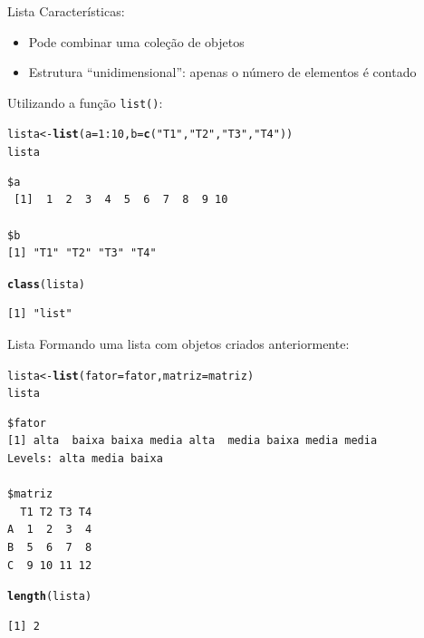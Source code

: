 \documentclass[10pt,handout]{beamer}\usepackage[]{graphicx}\usepackage[]{color}
\makeatletter
\newcommand{\hlnum}[1]{\textcolor[rgb]{0.686,0.059,0.569}{#1}}%
\newcommand{\hlstr}[1]{\textcolor[rgb]{0.192,0.494,0.8}{#1}}%
\newcommand{\hlopt}[1]{\textcolor[rgb]{0,0,0}{#1}}%
\newcommand{\hlstd}[1]{\textcolor[rgb]{0.345,0.345,0.345}{#1}}%
\newcommand{\hlkwb}[1]{\textcolor[rgb]{0.69,0.353,0.396}{#1}}%
\newcommand{\hlkwc}[1]{\textcolor[rgb]{0.333,0.667,0.333}{#1}}%
\newcommand{\hlkwd}[1]{\textcolor[rgb]{0.737,0.353,0.396}{\textbf{#1}}}%
\newenvironment{kframe}{%
 \def\at@end@of@kframe{}%
 \ifinner\ifhmode%
  \def\at@end@of@kframe{\end{minipage}}%
  \begin{minipage}{\columnwidth}%
 \fi\fi%
 \def\FrameCommand##1{\hskip\@totalleftmargin \hskip-\fboxsep
 \colorbox{shadecolor}{##1}\hskip-\fboxsep
     \hskip-\linewidth \hskip-\@totalleftmargin \hskip\columnwidth}%
 \MakeFramed {\advance\hsize-\width
   \@totalleftmargin\z@ \linewidth\hsize
   \@setminipage}}%
 {\par\unskip\endMakeFramed%
 \at@end@of@kframe}
\newenvironment{knitrout}{}{} %
\makeatother
\begin{document}
\begin{frame}[fragile]{Lista}
Características:
\begin{itemize}
\item Pode combinar uma coleção de objetos
\item Estrutura ``unidimensional'': apenas o número de elementos é
  contado
\end{itemize}
Utilizando a função \texttt{list()}:
\begin{knitrout}\small
{}\color{fgcolor}\begin{kframe}
\begin{alltt}
\hlstd{lista} \hlkwb{<-} \hlkwd{list}\hlstd{(}\hlkwc{a} \hlstd{=} \hlnum{1}\hlopt{:}\hlnum{10}\hlstd{,} \hlkwc{b} \hlstd{=} \hlkwd{c}\hlstd{(}\hlstr{"T1"}\hlstd{,}\hlstr{"T2"}\hlstd{,}\hlstr{"T3"}\hlstd{,}\hlstr{"T4"}\hlstd{))}
\hlstd{lista}
\end{alltt}
\begin{verbatim}
$a
 [1]  1  2  3  4  5  6  7  8  9 10

$b
[1] "T1" "T2" "T3" "T4"
\end{verbatim}
\begin{alltt}
\hlkwd{class}\hlstd{(lista)}
\end{alltt}
\begin{verbatim}
[1] "list"
\end{verbatim}
\end{kframe}
\end{knitrout}
\end{frame}

\begin{frame}[fragile]{Lista}
Formando uma lista com objetos criados anteriormente:
\begin{knitrout}\small
{}\color{fgcolor}\begin{kframe}
\begin{alltt}
\hlstd{lista} \hlkwb{<-} \hlkwd{list}\hlstd{(}\hlkwc{fator} \hlstd{= fator,} \hlkwc{matriz} \hlstd{= matriz)}
\hlstd{lista}
\end{alltt}
\begin{verbatim}
$fator
[1] alta  baixa baixa media alta  media baixa media media
Levels: alta media baixa

$matriz
  T1 T2 T3 T4
A  1  2  3  4
B  5  6  7  8
C  9 10 11 12
\end{verbatim}
\begin{alltt}
\hlkwd{length}\hlstd{(lista)}
\end{alltt}
\begin{verbatim}
[1] 2
\end{verbatim}
\end{kframe}
\end{knitrout}
\end{frame}
\end{document}
